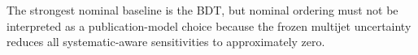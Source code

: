The strongest nominal baseline is the BDT, but nominal ordering must not be interpreted as a publication-model choice because the frozen multijet uncertainty reduces all systematic-aware sensitivities to approximately zero.
